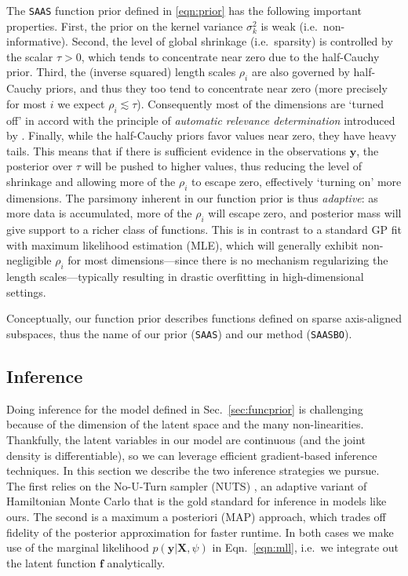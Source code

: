 \documentclass[accepted]{uai2021} %
\newcommand{\algoname}{{\texttt {SAASBO}}}
\newcommand{\priorname}{{\texttt {SAAS}}}
\newcommand{\by}{\mathbf{y}}
\newcommand{\bff}{\mathbf{f}}
\newcommand{\bX}{\mathbf{X}}
\begin{document}
The \priorname{} function prior defined in \eqref{eqn:prior} has the following important properties.
First, the prior on the kernel variance $\sigma_k^2$ is weak (i.e.~non-informative).
Second, the level of global shrinkage (i.e.~sparsity)
is controlled by the scalar $\tau>0$, which tends to concentrate near zero due to the half-Cauchy prior.
Third, the (inverse squared) length scales $\rho_i$ are also governed by half-Cauchy priors, and thus they too tend to concentrate near zero (more precisely for most $i$ we expect $\rho_i \lesssim \tau$).
Consequently most of the dimensions are `turned off' in accord with the principle of \emph{automatic relevance determination} introduced by \cite{mackay1994automatic}. Finally, while the half-Cauchy priors favor values near zero, they have heavy tails.
This means that if there is sufficient evidence in the observations $\by$, the posterior over $\tau$ will be pushed to higher values, thus reducing the level of shrinkage and allowing more of the $\rho_i$ to escape zero, effectively `turning on' more dimensions.
The parsimony inherent in our function prior is thus \emph{adaptive}: as more data is accumulated, more of the $\rho_i$ will escape zero, and posterior mass will give support to a richer class of functions.
This is in contrast to a standard GP fit with maximum likelihood estimation (MLE), which will generally exhibit non-negligible $\rho_i$ for most dimensions---since there is no mechanism regularizing the length scales---typically resulting in drastic overfitting in high-dimensional settings.

Conceptually, our function prior describes functions defined on sparse axis-aligned subspaces, thus the name of our prior (\priorname) and our method (\algoname).

\subsection{Inference}
\label{sec:inference}

Doing inference for the model defined in Sec.~\ref{sec:funcprior} is challenging because of the dimension of the
latent space and the many non-linearities.
Thankfully, the latent variables in our model are continuous (and the joint density is differentiable), so we can leverage efficient gradient-based inference techniques.
In this section we describe the two inference strategies we pursue.
The first relies on the No-U-Turn sampler (NUTS) \citep{hoffman2014no},
an adaptive variant of Hamiltonian Monte Carlo that is the gold standard for inference in models like ours.
The second is a maximum a posteriori (MAP) approach, which trades off fidelity of the posterior approximation
for faster runtime.
In both cases we make use of the marginal likelihood $p(\by|\bX, \psi)$ in Eqn.~\eqref{eqn:mll}, i.e.~we integrate out the
latent function $\bff$ analytically.
\end{document}
